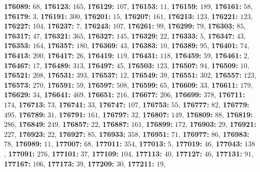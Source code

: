 \textsf{\bfseries 176089:} $68$, \textsf{\bfseries 176123:} $165$, \textsf{\bfseries 176129:} $107$, \textsf{\bfseries 176153:} $11$, \textsf{\bfseries 176159:} $189$, \textsf{\bfseries 176161:} $58$, \textsf{\bfseries 176179:} $3$, \textsf{\bfseries 176191:} $300$, \textsf{\bfseries 176201:} $15$, \textsf{\bfseries 176207:} $161$, \textsf{\bfseries 176213:} $123$, \textsf{\bfseries 176221:} $123$, \textsf{\bfseries 176227:} $104$, \textsf{\bfseries 176237:} $7$, \textsf{\bfseries 176243:} $107$, \textsf{\bfseries 176261:} $99$, \textsf{\bfseries 176299:} $79$, \textsf{\bfseries 176303:} $85$, \textsf{\bfseries 176317:} $47$, \textsf{\bfseries 176321:} $365$, \textsf{\bfseries 176327:} $145$, \textsf{\bfseries 176329:} $22$, \textsf{\bfseries 176333:} $5$, \textsf{\bfseries 176347:} $43$, \textsf{\bfseries 176353:} $164$, \textsf{\bfseries 176357:} $180$, \textsf{\bfseries 176369:} $43$, \textsf{\bfseries 176383:} $10$, \textsf{\bfseries 176389:} $95$, \textsf{\bfseries 176401:} $74$, \textsf{\bfseries 176413:} $200$, \textsf{\bfseries 176417:} $26$, \textsf{\bfseries 176419:} $119$, \textsf{\bfseries 176431:} $118$, \textsf{\bfseries 176459:} $59$, \textsf{\bfseries 176461:} $2$, \textsf{\bfseries 176467:} $17$, \textsf{\bfseries 176489:} $313$, \textsf{\bfseries 176497:} $45$, \textsf{\bfseries 176503:} $123$, \textsf{\bfseries 176507:} $94$, \textsf{\bfseries 176509:} $10$, \textsf{\bfseries 176521:} $208$, \textsf{\bfseries 176531:} $393$, \textsf{\bfseries 176537:} $12$, \textsf{\bfseries 176549:} $39$, \textsf{\bfseries 176551:} $302$, \textsf{\bfseries 176557:} $123$, \textsf{\bfseries 176573:} $270$, \textsf{\bfseries 176591:} $59$, \textsf{\bfseries 176597:} $508$, \textsf{\bfseries 176599:} $65$, \textsf{\bfseries 176609:} $33$, \textsf{\bfseries 176611:} $179$, \textsf{\bfseries 176629:} $34$, \textsf{\bfseries 176641:} $469$, \textsf{\bfseries 176651:} $216$, \textsf{\bfseries 176677:} $206$, \textsf{\bfseries 176699:} $378$, \textsf{\bfseries 176711:} $174$, \textsf{\bfseries 176713:} $73$, \textsf{\bfseries 176741:} $33$, \textsf{\bfseries 176747:} $107$, \textsf{\bfseries 176753:} $55$, \textsf{\bfseries 176777:} $82$, \textsf{\bfseries 176779:} $495$, \textsf{\bfseries 176789:} $31$, \textsf{\bfseries 176791:} $161$, \textsf{\bfseries 176797:} $32$, \textsf{\bfseries 176807:} $149$, \textsf{\bfseries 176809:} $88$, \textsf{\bfseries 176819:} $286$, \textsf{\bfseries 176849:} $249$, \textsf{\bfseries 176857:} $22$, \textsf{\bfseries 176887:} $161$, \textsf{\bfseries 176899:} $172$, \textsf{\bfseries 176903:} $29$, \textsf{\bfseries 176921:} $227$, \textsf{\bfseries 176923:} $22$, \textsf{\bfseries 176927:} $85$, \textsf{\bfseries 176933:} $358$, \textsf{\bfseries 176951:} $71$, \textsf{\bfseries 176977:} $86$, \textsf{\bfseries 176983:} $78$, \textsf{\bfseries 176989:} $11$, \textsf{\bfseries 177007:} $68$, \textsf{\bfseries 177011:} $354$, \textsf{\bfseries 177013:} $5$, \textsf{\bfseries 177019:} $46$, \textsf{\bfseries 177043:} $138$, \textsf{\bfseries 177091:} $276$, \textsf{\bfseries 177101:} $37$, \textsf{\bfseries 177109:} $104$, \textsf{\bfseries 177113:} $40$, \textsf{\bfseries 177127:} $46$, \textsf{\bfseries 177131:} $91$, \textsf{\bfseries 177167:} $106$, \textsf{\bfseries 177173:} $39$, \textsf{\bfseries 177209:} $30$, \textsf{\bfseries 177211:} $19$, 
